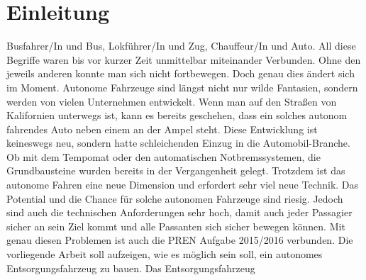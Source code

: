 \section{Einleitung}
Busfahrer/In und Bus, Lokführer/In und Zug, Chauffeur/In und Auto. All diese Begriffe waren bis vor kurzer Zeit unmittelbar miteinander Verbunden. Ohne den jeweils anderen konnte man sich nicht fortbewegen. Doch genau dies ändert sich im Moment. Autonome Fahrzeuge sind längst nicht nur wilde Fantasien, sondern werden von vielen Unternehmen entwickelt. Wenn man auf den Straßen von Kalifornien unterwegs ist, kann es bereits geschehen, dass ein solches autonom fahrendes Auto neben einem an der Ampel steht. Diese Entwicklung ist keineswegs neu, sondern hatte schleichenden Einzug in die Automobil-Branche. Ob mit dem Tempomat oder den automatischen Notbremssystemen, die Grundbausteine wurden bereits in der Vergangenheit gelegt.
Trotzdem ist das autonome Fahren eine neue Dimension und erfordert sehr viel neue Technik. Das Potential und die Chance für solche autonomen Fahrzeuge sind riesig. Jedoch sind auch die technischen Anforderungen sehr hoch, damit auch jeder Passagier sicher an sein Ziel kommt und alle Passanten sich sicher bewegen können. 
Mit genau diesen Problemen ist auch die PREN Aufgabe 2015/2016 verbunden. Die vorliegende Arbeit soll aufzeigen, wie es möglich sein soll, ein autonomes Entsorgungsfahrzeug zu bauen. Das Entsorgungsfahrzeug 
